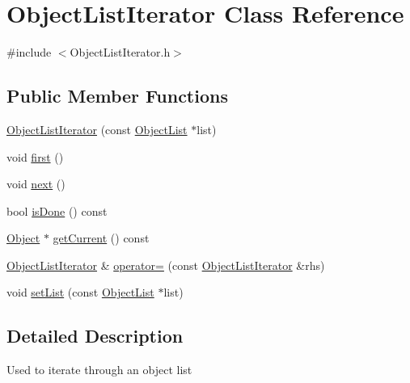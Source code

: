 \hypertarget{class_object_list_iterator}{\section{Object\+List\+Iterator Class Reference}
\label{class_object_list_iterator}
}


{\ttfamily \#include $<$Object\+List\+Iterator.\+h$>$}

\subsection*{Public Member Functions}
\begin{DoxyCompactItemize}
\item 
\hyperlink{class_object_list_iterator_a9ed73abe689d8f16c57e98bf1da3a03a}{Object\+List\+Iterator} (const \hyperlink{class_object_list}{Object\+List} $\ast$list)
\item 
void \hyperlink{class_object_list_iterator_a4cb98d9caf04259412e2f33004f55c51}{first} ()
\item 
void \hyperlink{class_object_list_iterator_a3d211dbe4a187fe741a4627a8625cb3f}{next} ()
\item 
bool \hyperlink{class_object_list_iterator_a7f433353b0cb9057f229a4df821b2238}{is\+Done} () const 
\item 
\hyperlink{class_object}{Object} $\ast$ \hyperlink{class_object_list_iterator_ac2e4a1e38c98df330121d8541d532e0f}{get\+Current} () const 
\item 
\hyperlink{class_object_list_iterator}{Object\+List\+Iterator} \& \hyperlink{class_object_list_iterator_a5978aeb613bb36a3f2a7e832ff7fa159}{operator=} (const \hyperlink{class_object_list_iterator}{Object\+List\+Iterator} \&rhs)
\item 
void \hyperlink{class_object_list_iterator_a50eceb2bfa254c1d935170107b9289e8}{set\+List} (const \hyperlink{class_object_list}{Object\+List} $\ast$list)
\end{DoxyCompactItemize}


\subsection{Detailed Description}
Used to iterate through an object list 

